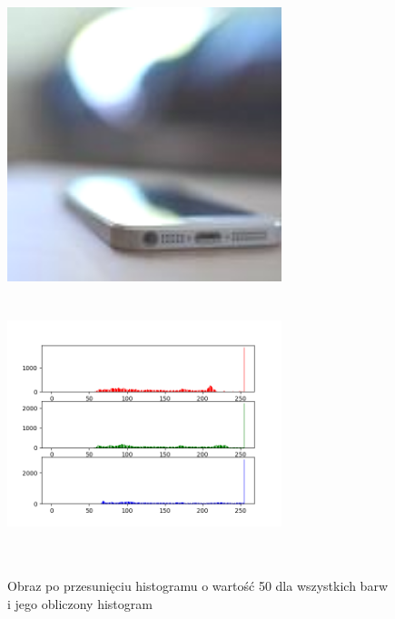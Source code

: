 \documentclass[a4paper,12pt]{book}
\begin{document}
\begin{figure}[H]
	\caption{Obraz po przesunięciu histogramu o wartość 50 dla wszystkich barw i jego obliczony histogram}
	\includegraphics[width=8cm, height=8cm]{6-2/move-histogram-image-phone-(50,50,50).png}
	\includegraphics[width=8cm, height=8cm]{6-2/move-histogram-phone-(50,50,50).png}
\end{figure}
\end{document}
